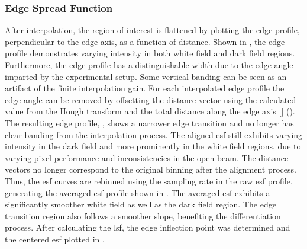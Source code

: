 \documentclass[../../../../main.tex]{subfiles}
\begin{document}
%
    \subsubsection{Edge Spread Function}%
    \label{app:image-processing:modulation-transfer-function:analytical-methods:edge-spread-function}%
    After interpolation, the region of interest is flattened by plotting the edge profile, perpendicular to the edge axis, as a function of distance.
    Shown in , the edge profile demonstrates varying intensity in both white field and dark field regions.
    Furthermore, the edge profile has a distinguishable width due to the edge angle imparted by the experimental setup.
    Some vertical banding can be seen as an artifact of the finite interpolation gain.
    For each interpolated edge profile  the edge angle \Xvariable{\theta} can be removed by offsetting the distance vector  using the calculated value from the Hough transform and the total distance along the edge axis [] ().
    The resulting edge profile, , shows a narrower edge transition and no longer has clear banding from the interpolation process.
    The aligned \gls{esf} still exhibits varying intensity in the dark field and more prominently in the white field regions, due to varying pixel performance and inconsistencies in the open beam.
    The distance vectors no longer correspond to the original binning after the alignment process.
    Thus, the \gls{esf} curves are rebinned using the sampling rate in the raw \gls{esf} profile, generating the averaged \gls{esf} profile shown in .
    The averaged \gls{esf} exhibits a significantly smoother white field as well as the dark field region.
    The edge transition region also follows a smoother slope, benefiting the differentiation process.     
    After calculating the \gls{lsf}, the edge inflection point was determined and the centered \gls{esf} plotted in .
\end{document}

